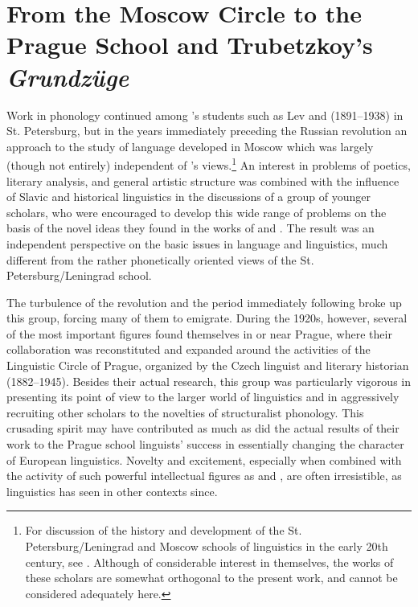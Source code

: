 \chapter{From the Moscow Circle to the Prague School and Trubetzkoy's \emph{Grundzüge}}
\label{ch.prague}

Work in phonology continued among {\Baudouin}'s students such as Lev
{} and  (1891--1938) in St. Petersburg, but in the
years immediately preceding the {Russian} revolution an approach to the
study of language developed in Moscow which was largely (though not
entirely) independent of {\Baudouin}'s views.\footnote{For discussion of
  the history and development of the St. Petersburg/Leningrad and
  Moscow schools of linguistics in the early 20th century, see
  \citealt{iosad21:soviet.phonology}. Although of considerable
  interest in themselves, the works of these scholars are somewhat
  orthogonal to the present work, and cannot be considered adequately
  here.} An interest in problems of poetics, literary analysis, and
general artistic structure was combined with the influence of Slavic
and historical linguistics in the discussions of a group of younger
scholars, who were encouraged to develop this wide range of problems
on the basis of the novel ideas they found in the works of {\Saussure}
and {\Baudouin}. The result was an independent perspective on the basic
issues in language and linguistics, much different from the rather
phonetically oriented views of the St. Petersburg/Leningrad school.

The turbulence of the revolution and the period immediately following
broke up this group, forcing many of them to emigrate. During the
1920s, however, several of the most important figures found themselves
in or near Prague, where their collaboration was reconstituted and
expanded around the activities of the {Linguistic Circle of Prague},
organized by the {Czech} linguist and literary historian 
(1882–1945). Besides their actual research, this group was
particularly vigorous in presenting its point of view to the larger
world of linguistics and in aggressively recruiting other scholars to
the novelties of structuralist phonology. This crusading spirit may
have contributed as much as did the actual results of their work to
the Prague school linguists' success in essentially changing the
character of European linguistics. Novelty and excitement, especially
when combined with the activity of such powerful intellectual figures
as {\Jakobson} and {\Trubetzkoy}, are often irresistible, as linguistics has
seen in other contexts since.

